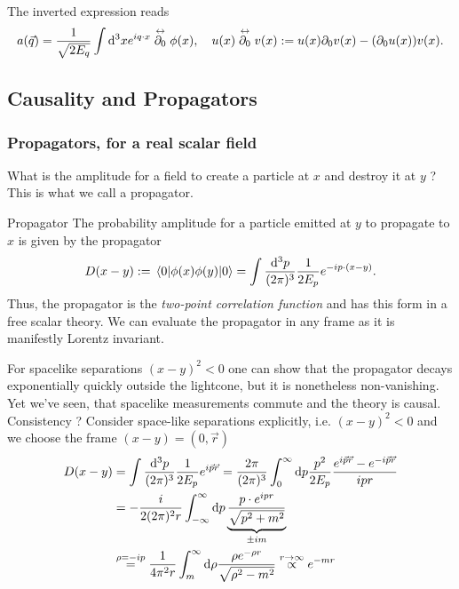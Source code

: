 The inverted expression reads 
\begin{equation}
	a(\vec{q}) = \frac{1}{\sqrt{2 E_q}} \int \mathrm{d}^3xe^{i q\cdot x} \stackrel{\leftrightarrow}{\partial_0} \phi(x), \quad u(x)\stackrel{\leftrightarrow}{\partial_0} v(x) := u(x) \partial_0 v(x) - (\partial_0 u(x)) v(x).
\end{equation}






\subsection{Causality and Propagators}
\subsubsection{Propagators, for a real scalar field}
What is the amplitude for a field to create a particle at $x$ and destroy it at $y$ ? This is what we call a propagator.
\begin{mybox}{Propagator}
	The probability amplitude for a particle emitted at $y$ to propagate to $x$ is given by the propagator
	\begin{equation}
		D(x-y) := \expval{\phi(x) \phi(y)}{0} = \int \frac{\mathrm{d}^3 p}{(2 \pi)^3} \frac{1}{2 E_p} e^{- i p\cdot (x-y)}.
	\end{equation}
	Thus, the propagator is the \emph{two-point correlation function} and has this form in a free scalar theory. We can evaluate the propagator in any frame as it is manifestly Lorentz invariant.
\end{mybox}
For spacelike separations $(x-y)^2<0$ one can show that the propagator decays exponentially quickly outside the lightcone, but it is nonetheless non-vanishing. Yet we've seen, that spacelike measurements commute and the theory is causal. Consistency ?
Consider space-like separations explicitly, i.e. $(x-y)^2 <0$ and we choose the frame $(x-y)=(0,\vec{r})$
\begin{align*}
	D(x-y) &= \int \frac{\mathrm{d}^3 p}{(2 \pi)^3} \frac{1}{2 E_p} e^{i \vec{p}\vec{r}} = \frac{2 \pi}{(2 \pi)^3} \int_0^\infty \mathrm{d} p \frac{p^2}{2 E_p} \frac{e^{i \vec{p}\vec{r}} - e^{-i \vec{p}\vec{r}}}{i pr} \\
		&= -\frac{i}{2 (2 \pi)^2 r} \int_{-\infty}^\infty \mathrm{d} p \underbrace{\frac{p \cdot e^{ipr}}{\sqrt{p^2+m^2}}}_{\pm im}\\
		&\stackrel{\rho=-ip}{=} \frac{1}{4 \pi^2 r} \int_m^\infty \mathrm{d} \rho \frac{\rho e^{-\rho r}}{\sqrt{\rho^2-m^2}} \stackrel{r\rightarrow\infty}{\propto} e^{-mr}
\end{align*}
